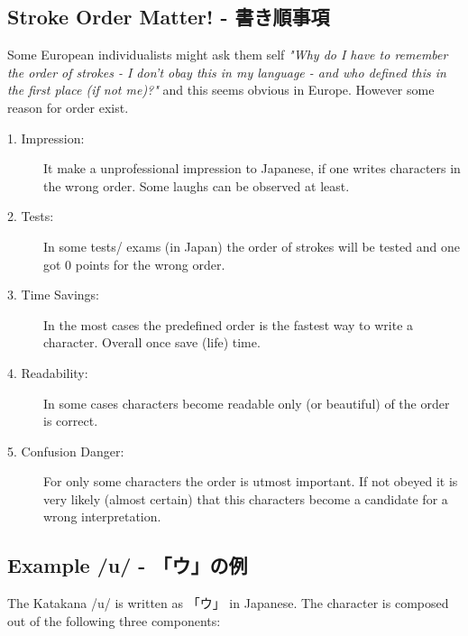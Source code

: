 \subsection{Stroke Order Matter! - 書き順事項}\label{sec:StrokeOrderMatter}

Some European individualists might ask them self \textit{"Why do I have to
remember the order of strokes - I don't obay this in my language - and who
defined this in the first place (if not me)?"} and this seems obvious in
Europe. However some reason for order exist. 


\begin{description}

\item[1. Impression:] It make a unprofessional impression to Japanese, if one
writes characters in the wrong order. Some laughs can be observed at least.

\item[2. Tests:]  In some tests/ exams (in Japan) the order of strokes will be
tested and one got 0 points for the wrong order. 

\item[3. Time Savings:] In the most cases the predefined order is the fastest
way to write a character. Overall once save (life) time.

\item[4. Readability:] In some cases characters become readable only (or
beautiful) of the order is correct.

\item[5. Confusion Danger:] For only some characters the order is utmost
important. If not obeyed it is very likely (almost certain) that this
characters become a candidate for a wrong interpretation. 

\end{description}
\normalsize

\newpage
\subsection{Example /u/  - {「ウ」の例} }

The Katakana /u/ is written as {「ウ」} in Japanese. The character is composed
out of the following three components:

\bigskip 
{}
\bigskip 
{}
\bigskip 
{} 


